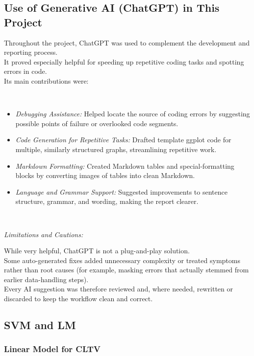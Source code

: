 \documentclass[
]{article}
\begin{document}
\hypertarget{use-of-generative-ai-chatgpt-in-this-project}{%
\subsection{Use of Generative AI (ChatGPT) in This
Project}\label{use-of-generative-ai-chatgpt-in-this-project}}

Throughout the project, ChatGPT was used to complement the development
and reporting process.\\
It proved especially helpful for speeding up repetitive coding tasks and
spotting errors in code.\\
Its main contributions were:

~

\begin{itemize}
\item
  \emph{Debugging Assistance:} Helped locate the source of coding errors
  by suggesting possible points of failure or overlooked code segments.
\item
  \emph{Code Generation for Repetitive Tasks:} Drafted template ggplot
  code for multiple, similarly structured graphs, streamlining
  repetitive work.
\item
  \emph{Markdown Formatting:} Created Markdown tables and
  special-formatting blocks by converting images of tables into clean
  Markdown.
\item
  \emph{Language and Grammar Support:} Suggested improvements to
  sentence structure, grammar, and wording, making the report clearer.
\end{itemize}

~

\emph{Limitations and Cautions:}

While very helpful, ChatGPT is not a plug-and-play solution.\\
Some auto-generated fixes added unnecessary complexity or treated
symptoms rather than root causes (for example, masking errors that
actually stemmed from earlier data-handling steps).\\
Every AI suggestion was therefore reviewed and, where needed, rewritten
or discarded to keep the workflow clean and correct.

\hypertarget{svm-and-lm}{%
\subsection{SVM and LM}\label{svm-and-lm}}

\hypertarget{linear-model-for-cltv}{%
\subsubsection{Linear Model for CLTV}\label{linear-model-for-cltv}}
\end{document}
